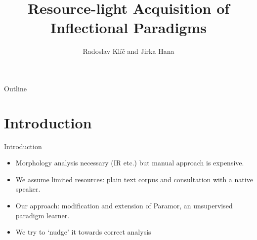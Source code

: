 \documentclass[hyperref={pdfencoding=unicode, unicode=true}, xcolor=dvipsnames]{beamer}
\title[Resource-light Acquisition of Inflectional Paradigms]{Resource-light Acquisition of Inflectional Paradigms}
\author{Radoslav Klíč and Jirka Hana}
\institute{Geneea Analytics / MFF UK Praha}
\date{}
\begin{document}

\begin{frame}
\titlepage
\end{frame}

\begin{frame}{Outline}
	\tableofcontents
\end{frame}

\section{Introduction}

\begin{frame}{Introduction}

\begin{itemize}

\item Morphology analysis necessary (IR etc.) but manual approach is expensive.

\item We assume limited resources: plain text corpus and consultation with a native speaker.

\item Our approach: modification and extension of Paramor, an unsupervised paradigm learner.

\item We try to `nudge' it towards correct analysis
\end{itemize}

\end{frame}
\end{document}
